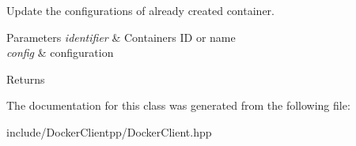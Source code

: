 Update the configurations of already created container. 


\begin{DoxyParams}{Parameters}
{\em identifier} & Container\textquotesingle{}s ID or name \\
\hline
{\em config} & configuration \\
\hline
\end{DoxyParams}
\begin{DoxyReturn}{Returns}

\end{DoxyReturn}


The documentation for this class was generated from the following file\+:\begin{DoxyCompactItemize}
\item 
include/\+Docker\+Clientpp/Docker\+Client.\+hpp\end{DoxyCompactItemize}
